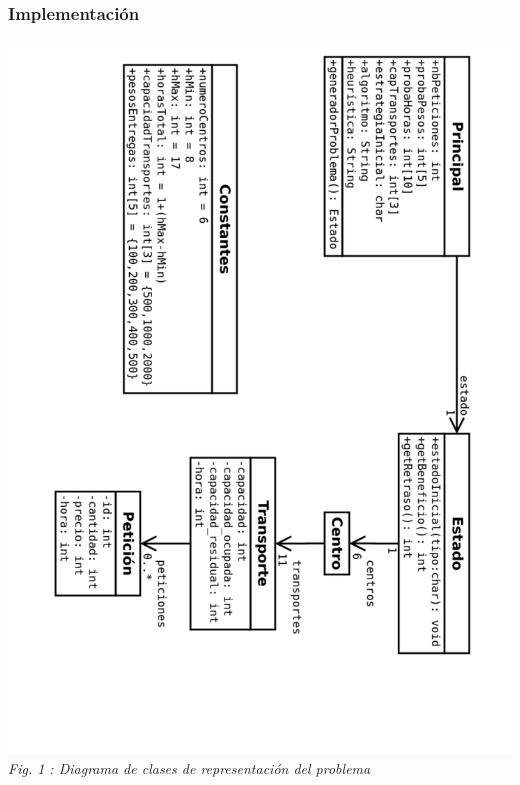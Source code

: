 \documentclass{article}
\begin{document}
\subsubsection{Implementación}
\begin{center} \includegraphics[width=14cm, angle=90]{clases}\\
{\it Fig. 1 : Diagrama de clases de representación del problema} \end{center}
\end{document}
